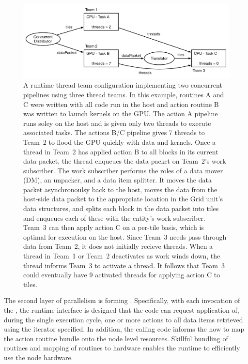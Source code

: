 \documentclass{article}
\begin{document}
\begin{figure}[!ht]
\begin{center}
\includegraphics[width=5.5in]{ConcurrentItorExample.pdf} \caption[]{A runtime thread team configuration implementing two concurrent pipelines
using three thread teams.  In this example, routines A and C were written
with all code run in the host and  action routine B was written to launch kernels on the GPU.  The action A pipeline
runs soley on the host and is given only two threads to execute associated tasks.  The
actions B/C pipeline gives 7 threads to Team~2 to flood the
GPU quickly with data and kernels.  Once a thread in Team~2 has
applied action B to all blocks in its current data packet, the thread
enqueues the data packet on Team~2's work subscriber.  The work subscriber performs the
roles of a data mover (DM), an unpacker, and a data item splitter.  It moves the data packet asynchronoulsy back to the host, moves the data from
the host-side data packet to the appropriate location in the Grid unit's data
structures, and splits each block in the data packet into tiles and enqueues
each of these with the entity's work subscriber.  Team~3 can then apply
action C on a per-tile basis, which is optimal for execution on the host.  Since Team~3
needs pass through data from Team~2, it does not initially recieve threads.  When a thread in Team~1
or Team~2 deactivates as work winds down, the thread informs Team~3 to activate
a thread.  It follows that Team~3 could eventually have 9 activated threads for
applying action C to tiles.}
\label{fig:ConcurrentItor}
\end{center}
\end{figure}

The second layer of parallelism is forming
\textbf{\actionroutinebundles}.  Specifically, with each invocation of the \OR, the runtime interface
is designed that the code
can request application of, during the single execution cycle, one or more
actions to all data items retrieved using the iterator
specified.  In addition, the calling code informs
the \OR how to map the action routine bundle onto the node level resources.  Skillful
bundling of routines and mapping of routines to hardware enables the
runtime to efficiently use the node hardware.\\
\end{document}
